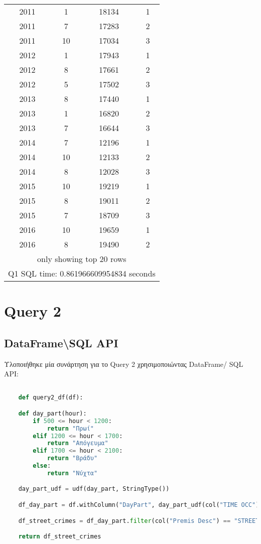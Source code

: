 \documentclass{article}
\begin{document}
\begin{center}
\begin{tabular}[t]{|c|c|c|c|}
2011 & 1 & 18134 & 1 \\
2011 & 7 & 17283 & 2 \\
2011 & 10 & 17034 & 3 \\
2012 & 1 & 17943 & 1 \\
2012 & 8 & 17661 & 2 \\
2012 & 5 & 17502 & 3 \\
2013 & 8 & 17440 & 1 \\
2013 & 1 & 16820 & 2 \\
2013 & 7 & 16644 & 3 \\
2014 & 7 & 12196 & 1 \\
2014 & 10 & 12133 & 2 \\
2014 & 8 & 12028 & 3 \\
2015 & 10 & 19219 & 1 \\
2015 & 8 & 19011 & 2 \\
2015 & 7 & 18709 & 3 \\
2016 & 10 & 19659 & 1 \\
2016 & 8 & 19490 & 2 \\
\hline
\multicolumn{4}{|c|}{only showing top 20 rows} \\
\hline
\multicolumn{4}{|c|}{Q1 SQL time: 0.861966609954834 seconds} \\
\hline
\end{tabular}
\end{center}

\vspace{4\baselineskip}


\section{Query 2}


\vspace{1\baselineskip}

\subsection*{DataFrame\textbackslash SQL  API}

Υλοποιήθηκε μία συνάρτηση για το Query 2 χρησιμοποιώντας DataFrame/ SQL API:

\begin{lstlisting}[language = Python]

    def query2_df(df):

    def day_part(hour):
        if 500 <= hour < 1200:
            return "Πρωί"
        elif 1200 <= hour < 1700:
            return "Απόγευμα"
        elif 1700 <= hour < 2100:
            return "Βράδυ"
        else:
            return "Νύχτα"

    day_part_udf = udf(day_part, StringType())

    df_day_part = df.withColumn("DayPart", day_part_udf(col("TIME OCC")))

    df_street_crimes = df_day_part.filter(col("Premis Desc") == "STREET").groupBy("DayPart").count().orderBy(col("count").desc())

    return df_street_crimes
\end{lstlisting}
\end{document}
